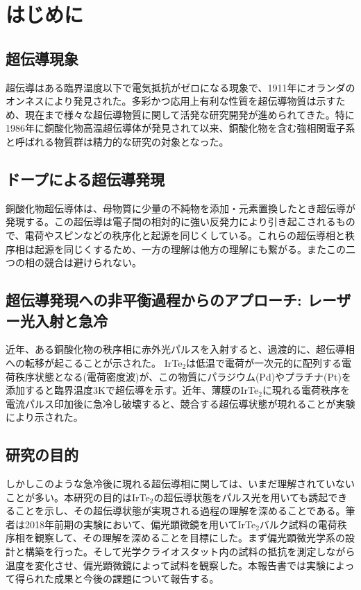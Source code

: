 \section{はじめに}
\subsection{超伝導現象}
超伝導はある臨界温度以下で電気抵抗がゼロになる現象で、1911年にオランダのオンネスにより発見された。多彩かつ応用上有利な性質を超伝導物質は示すため、現在まで様々な超伝導物質に関して活発な研究開発が進められてきた。特に1986年に銅酸化物高温超伝導体が発見されて以来、銅酸化物を含む強相関電子系と呼ばれる物質群は精力的な研究の対象となった。

\subsection{ドープによる超伝導発現}
銅酸化物超伝導体は、母物質に少量の不純物を添加・元素置換したとき超伝導が発現する。この超伝導は電子間の相対的に強い反発力により引き起こされるもので、電荷やスピンなどの秩序化と起源を同じくしている。これらの超伝導相と秩序相は起源を同じくするため、一方の理解は他方の理解にも繋がる。またこの二つの相の競合は避けられない。

\subsection{超伝導発現への非平衡過程からのアプローチ: レーザー光入射と急冷}
近年、ある銅酸化物の秩序相に赤外光パルスを入射すると、過渡的に、超伝導相への転移が起こることが示された\cite{Fausti}。
IrTe$_2$は低温で電荷が一次元的に配列する電荷秩序状態となる(電荷密度波)が、この物質にパラジウム(Pd)やプラチナ(Pt)を添加すると臨界温度3Kで超伝導を示す。\cite{}近年、薄膜のIrTe$_2$に現れる電荷秩序を電流パルス印加後に急冷し破壊すると、競合する超伝導状態が現れることが実験により示された\cite{SC_IrTe2}。

\subsection{研究の目的}
しかしこのような急冷後に現れる超伝導相に関しては、いまだ理解されていないことが多い。本研究の目的はIrTe$_2$の超伝導状態をパルス光を用いても誘起できることを示し、その超伝導状態が実現される過程の理解を深めることである。筆者は2018年前期の実験において、偏光顕微鏡を用いてIrTe$_2$バルク試料の電荷秩序相を観察して、その理解を深めることを目標にした。まず偏光顕微光学系の設計と構築を行った。そして光学クライオスタット内の試料の抵抗を測定しながら温度を変化させ、偏光顕微鏡によって試料を観察した。本報告書では実験によって得られた成果と今後の課題について報告する。


